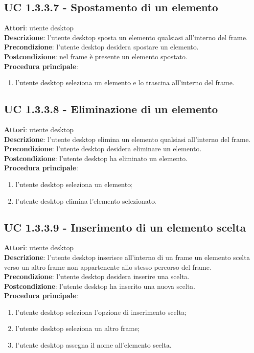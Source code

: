 \subsection{UC 1.3.3.7 - Spostamento di un elemento}{
	\label{uc1.3.3.7}
	\textbf{Attori}: utente desktop \\
	\textbf{Descrizione}: l'utente desktop sposta un elemento qualsiasi all'interno del frame. \\
	\textbf{Precondizione}: l'utente desktop desidera spostare un elemento.	\\
	\textbf{Postcondizione}: nel frame è presente un elemento spostato.	\\
	\textbf{Procedura principale}:
	\begin{enumerate}
		\item l'utente desktop seleziona un elemento e lo trascina all'interno del frame.
	\end{enumerate}
	}
\subsection{UC 1.3.3.8 - Eliminazione di un elemento}{
	\label{uc1.3.3.8}
	\textbf{Attori}: utente desktop \\
	\textbf{Descrizione}: l'utente desktop elimina un elemento qualsiasi all'interno del frame. \\
	\textbf{Precondizione}: l'utente desktop desidera eliminare un elemento.	\\
	\textbf{Postcondizione}: l'utente desktop ha eliminato un elemento.	\\
	\textbf{Procedura principale}:
	\begin{enumerate}
		\item l'utente desktop seleziona un elemento;
		\item l'utente desktop elimina l'elemento selezionato.
	\end{enumerate}
	}
\subsection{UC 1.3.3.9 - Inserimento di un elemento scelta}{
	\label{uc1.3.3.9}
	\textbf{Attori}: utente desktop \\
	\textbf{Descrizione}: l'utente desktop inserisce all'interno di un frame un elemento scelta verso un altro frame non appartenente allo stesso percorso del frame. \\
	\textbf{Precondizione}: l'utente desktop desidera inserire una scelta.	\\
	\textbf{Postcondizione}: l'utente desktop ha inserito una nuova scelta.	\\
	\textbf{Procedura principale}:
	\begin{enumerate}
		\item l'utente desktop seleziona l'opzione di inserimento scelta;
		\item l'utente desktop seleziona un altro frame;
		\item l'utente desktop assegna il nome all'elemento scelta.
	\end{enumerate}
	}
